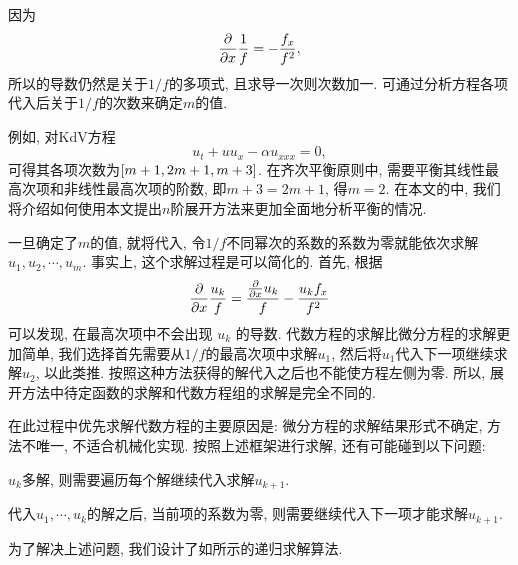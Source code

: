 因为
\begin{equation}
    \frac{\partial}{\partial x}\frac{1}{f}=-\frac{f_x}{f^2},
\end{equation}
所以的导数仍然是关于$1/f$的多项式, 且求导一次则次数加一. 可通过分析方程各项代入后关于$1/f$的次数来确定$m$的值.

例如, 对KdV方程\CITEaaKdV{}
\begin{equation}
    u_t+uu_x-\alpha u_{xxx}=0,
\end{equation}
可得其各项次数为$\left[m+1,2m+1,m+3\right]$. 在齐次平衡原则中, 需要平衡其线性最高次项和非线性最高次项的阶数, 即$m+3=2m+1$, 得$m=2$. 在本文的中, 我们将介绍如何使用本文提出$n$阶展开方法来更加全面地分析平衡的情况. 

一旦确定了$m$的值, 就将代入, 令$1/f$不同幂次的系数的系数为零就能依次求解$u_1,u_2,\cdots,u_m$. 事实上, 这个求解过程是可以简化的. 首先, 根据 
\begin{equation}
    \frac{\partial}{\partial x}\frac{u_k}{f}=\frac{\frac{\partial}{\partial x}u_k}{f}-\frac{u_kf_x}{f^2}
\end{equation} 
可以发现, 在最高次项中不会出现 $u_k$ 的导数. 代数方程的求解比微分方程的求解更加简单, 我们选择首先需要从$1/f$的最高次项中求解$u_1$, 然后将$u_1$代入下一项继续求解$u_2$, 以此类推. 按照这种方法获得的解代入之后也不能使方程左侧为零. 所以, \Painleve{}展开方法中待定函数的求解和代数方程组的求解是完全不同的.

在此过程中优先求解代数方程的主要原因是: 微分方程的求解结果形式不确定, 方法不唯一, 不适合机械化实现. 按照上述框架进行求解, 还有可能碰到以下问题: 
\begin{compactenum}[(1)]
\item $u_k$多解, 则需要遍历每个解继续代入求解$u_{k+1}$.
\item 代入$u_1,\cdots,u_k$的解之后, 当前项的系数为零, 则需要继续代入下一项才能求解$u_{k+1}$. 
\end{compactenum}
为了解决上述问题, 我们设计了如所示的递归求解算法. 


